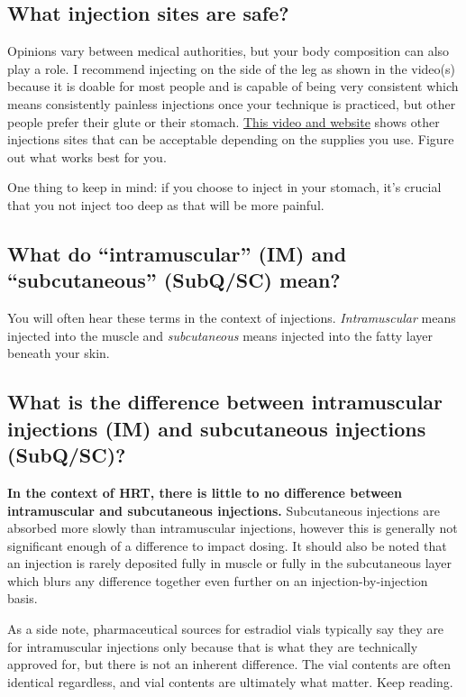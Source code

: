 \documentclass{article}
\begin{document}
\subsection{What injection sites are safe?}\label{5-5}

Opinions vary between medical authorities, but your body composition can also play a role. I recommend injecting on the side of the leg as shown in the video(s) because it is doable for most people and is capable of being very consistent which means consistently painless injections once your technique is practiced, but other people prefer their glute or their stomach. \href{https://vertisis.com/articles/how-to-self-administer-a-subcutaneous-injection}{This video and website} shows other injections sites that can be acceptable depending on the supplies you use. Figure out what works best for you.

One thing to keep in mind: if you choose to inject in your stomach, it's crucial that you not inject too deep as that will be more painful.

\subsection{What do “intramuscular” (IM) and “subcutaneous” (SubQ/SC) mean?}

You will often hear these terms in the context of injections. \textit{Intramuscular} means injected into the muscle and \textit{subcutaneous} means injected into the fatty layer beneath your skin.

\subsection{What is the difference between intramuscular injections (IM) and subcutaneous injections (SubQ/SC)?}

\textbf{In the context of HRT, there is little to no difference between intramuscular and subcutaneous injections.} Subcutaneous injections are absorbed more slowly than intramuscular injections, however this is generally not significant enough of a difference to impact dosing. It should also be noted that an injection is rarely deposited fully in muscle or fully in the subcutaneous layer which blurs any difference together even further on an injection-by-injection basis.

As a side note, pharmaceutical sources for estradiol vials typically say they are for intramuscular injections only because that is what they are technically approved for, but there is not an inherent difference. The vial contents are often identical regardless, and vial contents are ultimately what matter. Keep reading.
\end{document}
